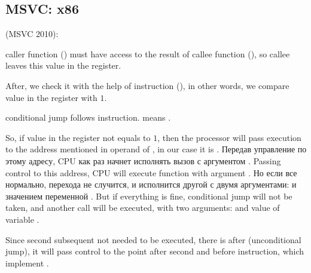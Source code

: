 \subsection{MSVC: x86}

 (MSVC 2010):



{\Gls{caller} function (\main) must have access to the result of \gls{callee} function (\scanf), 
so \gls{callee} leaves this value in the \EAX register.}

{After, we check it with the help of instruction  (),
in other words, we compare value in the \EAX register with $1$.} 

{\JNE conditional jump follows \CMP instruction. \JNE means .}

{So, if value in the \EAX register not equals to $1$, then the processor will pass execution to the 
address mentioned in operand of \JNE, in our case it is .}
\IFRU
{Передав управление по этому адресу, \ac{CPU} как раз начнет исполнять вызов \printf с 
аргументом .}
{Passing control to this address, \ac{CPU} will execute function \printf 
with argument .}
\IFRU
{Но если все нормально, перехода не случится, и исполнится другой \printf с двумя аргументами: 
 и значением переменной .}
{But if everything is fine, conditional jump will not be taken, and another \printf call 
will be executed, with two arguments:  and value of variable . }

{Since second subsequent \printf not needed to be executed, there is \JMP after (unconditional jump),
it will pass control to the point after second \printf and before  instruction, 
which implement .}


